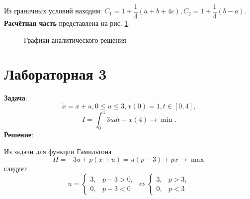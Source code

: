 \documentclass[a4paper, 12pt]{article}
\begin{document}
Из граничных условий находим: $C_1=1+\dfrac{1}{4}(a+b+4c),C_2 = 1+\dfrac{1}{4}(b-a)$.
{\bf Расчётная часть} представлена на рис. \ref{22}.
\begin{figure}[h]
    \noindent{}
    \caption{Графики аналитического решения}
    \label{22}
\end{figure} 

\section{Лабораторная 3}
{\bf Задача}:
\begin{equation}
    \dot x = x+u , 0\leq u \leq 3, x(0)=1, t \in [0,4],
\end{equation}
\begin{equation}
    I=\int_0^4 3 u dt - x(4) \rightarrow \min.
\end{equation}
{\bf Решение}:

Из задачи для функции Гамильтона 
\begin{equation}
    H=-3u+p(x+u)=u(p-3)+px \rightarrow \max
\end{equation}
следует
\begin{equation}
    u=
    \begin{cases}
        3, & p-3 >0,\\
        0, & p-3<0
    \end{cases} 
    \Leftrightarrow
    \begin{cases}
        3, & p >3,\\
        0, & p<3
    \end{cases} 
\end{equation}
\end{document}
